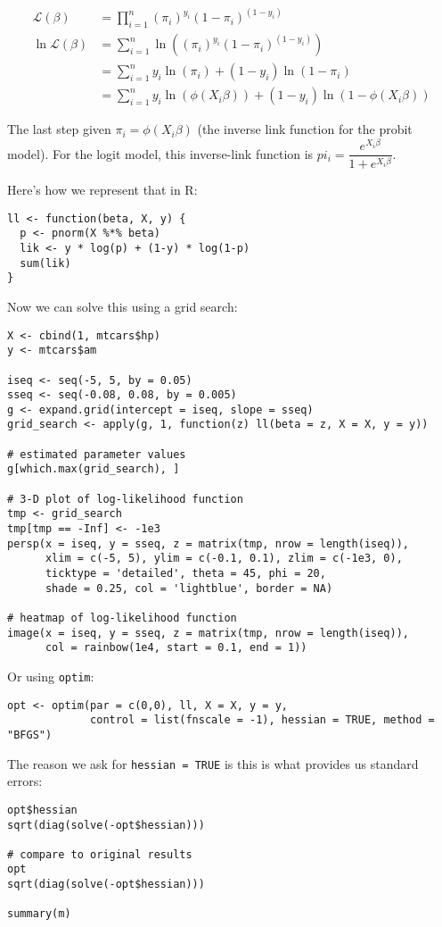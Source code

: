 \documentclass[a4paper,12pt]{article}
\newcommand{\lik}{\mathcal{L}}
\begin{document}
\begin{align*}
\lik(\beta) & = \prod_{i=1}^{n} (\pi_i)^{y_i} (1-\pi_i)^(1-y_i)\\
\ln\lik(\beta) & = \sum_{i=1}^{n} \ln((\pi_i)^{y_i} (1-\pi_i)^(1-y_i)) \\
 & = \sum_{i=1}^{n} y_i \ln(\pi_i) + (1-y_i) \ln(1-\pi_i)\\
 & = \sum_{i=1}^{n} y_i \ln(\phi(X_i\beta)) + (1-y_i) \ln(1-\phi(X_i\beta))
\end{align*}

The last step given $\pi_i = \phi(X_i\beta)$ (the inverse link function for the probit model). For the logit model, this inverse-link function is $pi_i = \dfrac{e^{X_i\beta}}{1+ e^{X_i\beta}}$.

Here's how we represent that in R:

\begin{lstlisting}
ll <- function(beta, X, y) {
  p <- pnorm(X %*% beta)
  lik <- y * log(p) + (1-y) * log(1-p)
  sum(lik)
}
\end{lstlisting}

Now we can solve this using a grid search:

\begin{lstlisting}
X <- cbind(1, mtcars$hp)
y <- mtcars$am

iseq <- seq(-5, 5, by = 0.05)
sseq <- seq(-0.08, 0.08, by = 0.005)
g <- expand.grid(intercept = iseq, slope = sseq)
grid_search <- apply(g, 1, function(z) ll(beta = z, X = X, y = y))

# estimated parameter values
g[which.max(grid_search), ]

# 3-D plot of log-likelihood function
tmp <- grid_search
tmp[tmp == -Inf] <- -1e3
persp(x = iseq, y = sseq, z = matrix(tmp, nrow = length(iseq)), 
      xlim = c(-5, 5), ylim = c(-0.1, 0.1), zlim = c(-1e3, 0), 
      ticktype = 'detailed', theta = 45, phi = 20, 
      shade = 0.25, col = 'lightblue', border = NA)

# heatmap of log-likelihood function
image(x = iseq, y = sseq, z = matrix(tmp, nrow = length(iseq)),
      col = rainbow(1e4, start = 0.1, end = 1))
\end{lstlisting}

Or using \texttt{optim}:

\begin{lstlisting}
opt <- optim(par = c(0,0), ll, X = X, y = y, 
             control = list(fnscale = -1), hessian = TRUE, method = "BFGS")
\end{lstlisting}


The reason we ask for \texttt{hessian = TRUE} is this is what provides us standard errors:

\begin{lstlisting}
opt$hessian
sqrt(diag(solve(-opt$hessian)))

# compare to original results
opt
sqrt(diag(solve(-opt$hessian)))

summary(m)
\end{lstlisting}
\end{document}
